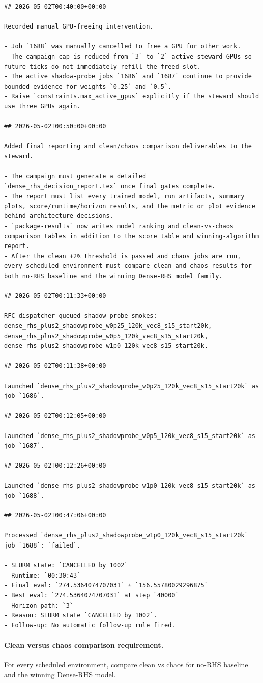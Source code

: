 \begin{verbatim}
## 2026-05-02T00:40:00+00:00

Recorded manual GPU-freeing intervention.

- Job `1688` was manually cancelled to free a GPU for other work.
- The campaign cap is reduced from `3` to `2` active steward GPUs so future ticks do not immediately refill the freed slot.
- The active shadow-probe jobs `1686` and `1687` continue to provide bounded evidence for weights `0.25` and `0.5`.
- Raise `constraints.max_active_gpus` explicitly if the steward should use three GPUs again.

## 2026-05-02T00:50:00+00:00

Added final reporting and clean/chaos comparison deliverables to the steward.

- The campaign must generate a detailed `dense_rhs_decision_report.tex` once final gates complete.
- The report must list every trained model, run artifacts, summary plots, score/runtime/horizon results, and the metric or plot evidence behind architecture decisions.
- `package-results` now writes model ranking and clean-vs-chaos comparison tables in addition to the score table and winning-algorithm report.
- After the clean +2% threshold is passed and chaos jobs are run, every scheduled environment must compare clean and chaos results for both no-RHS baseline and the winning Dense-RHS model family.

## 2026-05-02T00:11:33+00:00

RFC dispatcher queued shadow-probe smokes: dense_rhs_plus2_shadowprobe_w0p25_120k_vec8_s15_start20k, dense_rhs_plus2_shadowprobe_w0p5_120k_vec8_s15_start20k, dense_rhs_plus2_shadowprobe_w1p0_120k_vec8_s15_start20k.

## 2026-05-02T00:11:38+00:00

Launched `dense_rhs_plus2_shadowprobe_w0p25_120k_vec8_s15_start20k` as job `1686`.

## 2026-05-02T00:12:05+00:00

Launched `dense_rhs_plus2_shadowprobe_w0p5_120k_vec8_s15_start20k` as job `1687`.

## 2026-05-02T00:12:26+00:00

Launched `dense_rhs_plus2_shadowprobe_w1p0_120k_vec8_s15_start20k` as job `1688`.

## 2026-05-02T00:47:06+00:00

Processed `dense_rhs_plus2_shadowprobe_w1p0_120k_vec8_s15_start20k` job `1688`: `failed`.

- SLURM state: `CANCELLED by 1002`
- Runtime: `00:30:43`
- Final eval: `274.5364074707031` ± `156.55780029296875`
- Best eval: `274.5364074707031` at step `40000`
- Horizon path: `3`
- Reason: SLURM state `CANCELLED by 1002`.
- Follow-up: No automatic follow-up rule fired.

\end{verbatim}

\paragraph{Clean versus chaos comparison requirement.}
For every scheduled environment, compare clean vs chaos for no-RHS baseline and the winning Dense-RHS model.
